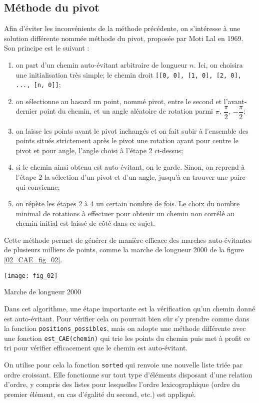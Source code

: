 \subsection*{Méthode du pivot}
Afin d’éviter les inconvénients de la méthode précédente, on s’intéresse à une solution différente nommée
méthode du pivot, proposée par Moti Lal en 1969. Son principe est le suivant :
\begin{enumerate}
\item on part d’un chemin auto-évitant arbitraire de longueur $n$. Ici, on choisira une initialisation très simple;
le chemin droit \lstinline{[[0, 0], [1, 0], [2, 0], ..., [n, 0]]};
\item on sélectionne au hasard un point, nommé pivot, entre le second et l’avant-dernier point du chemin,
et un angle aléatoire de rotation parmi $\pi$, $\dfrac{\pi}{2}$, $-\dfrac{\pi}{2}$;
\item on laisse les points avant le pivot inchangés et on fait subir à l’ensemble des points situés strictement
après le pivot une rotation ayant pour centre le pivot et pour angle, l’angle choisi à l’étape 2 ci-dessus;
\item si le chemin ainsi obtenu est auto-évitant, on le garde. Sinon, on reprend à l’étape 2 la sélection d’un
pivot et d’un angle, jusqu’à en trouver une paire qui convienne;
\item on répète les étapes 2 à 4 un certain nombre de fois. Le choix du nombre minimal de rotations à
effectuer pour obtenir un chemin non corrélé au chemin initial est laissé de côté dans ce sujet.
\end{enumerate}
Cette méthode permet de générer de manière efficace des marches auto-évitantes de plusieurs milliers de
points, comme la marche de longueur 2000 de la figure \ref{02_CAE_fig_02}.

\begin{marginfigure}[-2cm]
\texttt{[image: fig\_02]}
\caption{Marche de longueur 2000\label{02_CAE_fig_02}}
\end{marginfigure}

Dans cet algorithme, une étape importante est la vérification qu’un chemin donné est auto-évitant. Pour
vérifier cela on pourrait bien sûr s’y prendre comme dans la fonction \lstinline{positions_possibles}, mais on adopte une méthode différente avec une fonction \lstinline{est_CAE(chemin)} qui trie les points du chemin puis met à profit ce tri pour vérifier efficacement que le chemin est auto-évitant.

On utilise pour cela la fonction \lstinline{sorted} qui renvoie une nouvelle liste triée par ordre croissant. Elle fonctionne
sur tout type d’éléments disposant d’une relation d’ordre, y compris des listes pour lesquelles l’ordre lexicographique (ordre du premier élément, en cas d’égalité du second, etc.) est appliqué. %

